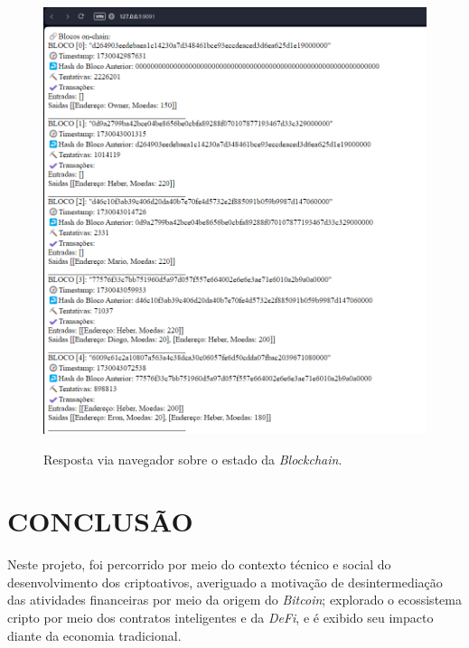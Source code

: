 \documentclass[article,12pt,oneside,a4paper,english,brazil]{unifil}
\begin{document}
\begin{Spacing}{1.5}
\begin{figure} [H]
	\centering
	\captionsetup{justification=centering}
	\caption{Resposta via navegador sobre o estado da \textit{Blockchain}.}
	\includegraphics[width=1\linewidth]{../images/navegador-blockchain.png}
	\label{fig:navegador}

\end{figure}
\clearpage


% 


\section*{CONCLUSÃO}

Neste projeto, foi percorrido por meio do contexto técnico e social do desenvolvimento dos criptoativos, averiguado a motivação de desintermediação das atividades financeiras por meio da origem do \textit{Bitcoin}; explorado o ecossistema cripto por meio dos contratos inteligentes e da \textit{DeFi}, e é exibido seu impacto diante da economia tradicional.


\end{Spacing}
\end{document}
